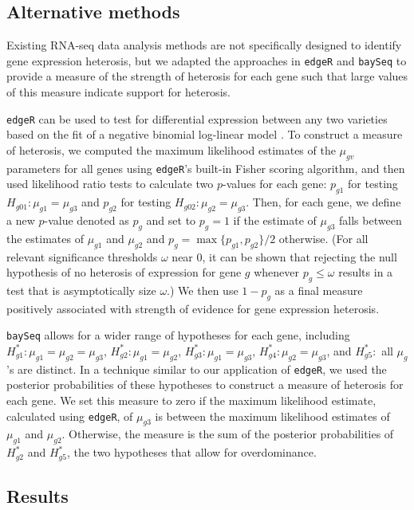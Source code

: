 \documentclass[useAMS,usenatbib,referee]{biom}
\newcommand{\edgeR}{{\tt edgeR}}
\newcommand{\RNAseq}{RNA-seq}
\begin{document}
\subsection{Alternative methods}
\label{s:alternative}

Existing \RNAseq{} data analysis methods are not specifically designed to identify gene expression heterosis, but we adapted the approaches in \edgeR{} and {\tt baySeq} to provide a measure of the strength of heterosis for each gene such that large values of this measure indicate support for heterosis.

\edgeR{} can be used to test for differential expression between any two varieties based on the fit of a negative binomial log-linear model \citep{robinson2007moderated, robinson2010edgeR}. To construct a measure of heterosis, we computed the maximum likelihood estimates of the $\mu_{gv}$ parameters for all genes using \edgeR{}'s built-in Fisher scoring algorithm, and then used likelihood ratio tests to calculate two $p$-values for each gene: $p_{g1}$  for testing $H_{g01}:\mu_{g1}=\mu_{g3}$ and $p_{g2}$ for testing $H_{g02}:\mu_{g2}=\mu_{g3}$. Then, for each gene, we define a new $p$-value denoted as $p_g$ and set to $p_g=1$ if the estimate of $\mu_{g3}$ falls between the estimates of $\mu_{g1}$ and $\mu_{g2}$ and $p_g=\max\{p_{g1},p_{g2}\}/2$ otherwise.  (For all relevant significance thresholds $\omega$ near 0, it can be shown that rejecting the null hypothesis of no heterosis of expression for gene $g$ whenever $p_g\leq \omega$ results in a test that is asymptotically size $\omega$.)  We then use $1-p_g$ as a final measure positively associated with strength of evidence for gene expression heterosis. 

{\tt baySeq} allows for a wider range of hypotheses for each gene, including $H^*_{g1}: \mu_{g1}=\mu_{g2}=\mu_{g3}$, $H^*_{g 2}: \mu_{g1}=\mu_{g2}$, $H^*_{g 3}: \mu_{g1}=\mu_{g3}$, $H^*_{g 4}: \mu_{g2}=\mu_{g3}$, and $H^*_{g 5}:$ all $\mu_g$'s are distinct. In a technique similar to our application of \edgeR{}, we used the posterior probabilities of these hypotheses to construct a measure of heterosis for each gene. We set this measure to zero if the maximum likelihood estimate, calculated using \edgeR{}, of $\mu_{g3}$ is between the maximum likelihood estimates of $\mu_{g1}$ and $\mu_{g2}$. Otherwise, the measure is the sum of the posterior probabilities of $H^*_{g 2}$ and $H^*_{g 5}$, the two hypotheses that allow for overdominance.



\subsection{Results}
\end{document}
